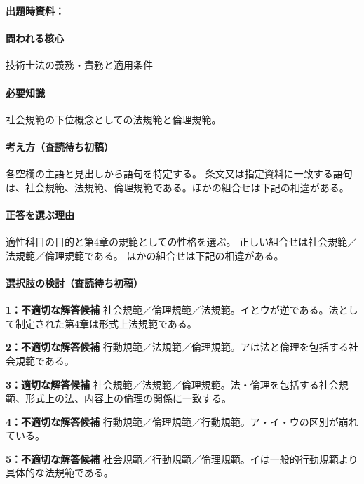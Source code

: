 \noindent\textbf{出題時資料：} \par

\paragraph{問われる核心} 技術士法の義務・責務と適用条件

\paragraph{必要知識} 社会規範の下位概念としての法規範と倫理規範。

\paragraph{考え方（査読待ち初稿）} 各空欄の主語と見出しから語句を特定する。 条文又は指定資料に一致する語句は、社会規範、法規範、倫理規範である。ほかの組合せは下記の相違がある。

\paragraph{正答を選ぶ理由} 適性科目の目的と第4章の規範としての性格を選ぶ。 正しい組合せは社会規範／法規範／倫理規範である。 ほかの組合せは下記の相違がある。

\paragraph{選択肢の検討（査読待ち初稿）}\mbox{}\par

\noindent\textbf{1：不適切な解答候補} 社会規範／倫理規範／法規範。イとウが逆である。法として制定された第4章は形式上法規範である。\par

\noindent\textbf{2：不適切な解答候補} 行動規範／法規範／倫理規範。アは法と倫理を包括する社会規範である。\par

\noindent\textbf{3：適切な解答候補} 社会規範／法規範／倫理規範。法・倫理を包括する社会規範、形式上の法、内容上の倫理の関係に一致する。\par

\noindent\textbf{4：不適切な解答候補} 行動規範／倫理規範／行動規範。ア・イ・ウの区別が崩れている。\par

\noindent\textbf{5：不適切な解答候補} 社会規範／行動規範／倫理規範。イは一般的行動規範より具体的な法規範である。\par

